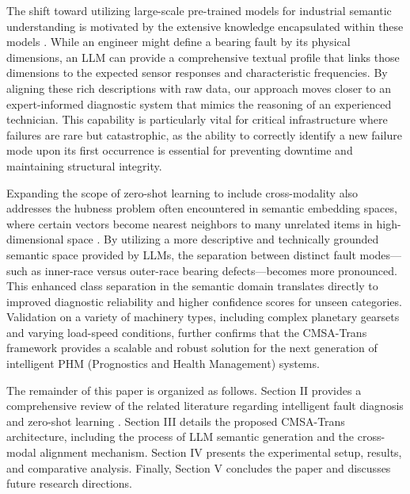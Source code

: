 The shift toward utilizing large-scale pre-trained models for industrial semantic understanding is motivated by the extensive knowledge encapsulated within these models \cite{zhao2023brain}. While an engineer might define a bearing fault by its physical dimensions, an LLM can provide a comprehensive textual profile that links those dimensions to the expected sensor responses and characteristic frequencies. By aligning these rich descriptions with raw data, our approach moves closer to an expert-informed diagnostic system that mimics the reasoning of an experienced technician. This capability is particularly vital for critical infrastructure where failures are rare but catastrophic, as the ability to correctly identify a new failure mode upon its first occurrence is essential for preventing downtime and maintaining structural integrity.

Expanding the scope of zero-shot learning to include cross-modality also addresses the hubness problem often encountered in semantic embedding spaces, where certain vectors become nearest neighbors to many unrelated items in high-dimensional space \cite{radovanovic2010hubs}. By utilizing a more descriptive and technically grounded semantic space provided by LLMs, the separation between distinct fault modes---such as inner-race versus outer-race bearing defects---becomes more pronounced. This enhanced class separation in the semantic domain translates directly to improved diagnostic reliability and higher confidence scores for unseen categories. Validation on a variety of machinery types, including complex planetary gearsets and varying load-speed conditions, further confirms that the CMSA-Trans framework provides a scalable and robust solution for the next generation of intelligent PHM (Prognostics and Health Management) systems.

The remainder of this paper is organized as follows. Section II provides a comprehensive review of the related literature regarding intelligent fault diagnosis and zero-shot learning \cite{li2022zero}. Section III details the proposed CMSA-Trans architecture, including the process of LLM semantic generation and the cross-modal alignment mechanism. Section IV presents the experimental setup, results, and comparative analysis. Finally, Section V concludes the paper and discusses future research directions.
